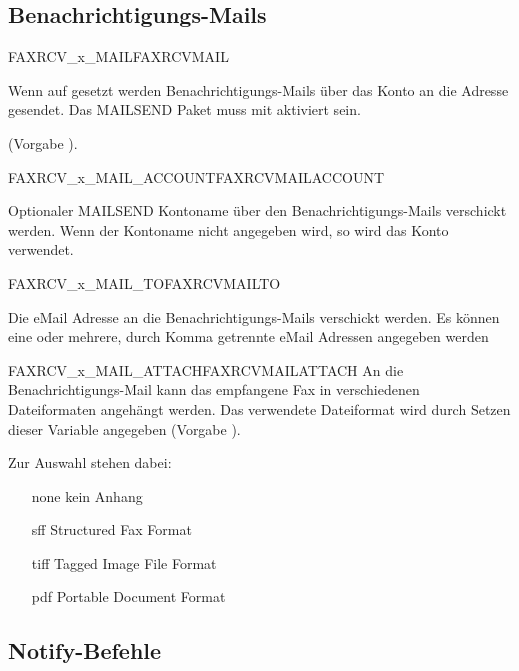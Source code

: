 \subsection{Benachrichtigungs-Mails}

\begin {description}

 {FAXRCV\_x\_MAIL}{FAXRCVMAIL}

  Wenn auf  gesetzt werden Benachrichtigungs-Mails über das Konto 
   an die Adresse 
   gesendet.
  Das MAILSEND Paket muss mit  aktiviert sein.
  
  (Vorgabe ). 
  
 {FAXRCV\_x\_MAIL\_ACCOUNT}{FAXRCVMAILACCOUNT}

  Optionaler MAILSEND Kontoname über den Benachrichtigungs-Mails verschickt werden.
  Wenn der Kontoname nicht angegeben wird, so wird das Konto 
  verwendet.

 {FAXRCV\_x\_MAIL\_TO}{FAXRCVMAILTO}

  Die eMail Adresse an die Benachrichtigungs-Mails verschickt werden.
  Es können eine oder mehrere, durch Komma getrennte eMail Adressen angegeben werden 

 {FAXRCV\_x\_MAIL\_ATTACH}{FAXRCVMAILATTACH}
  An die Benachrichtigungs-Mail kann das empfangene Fax in verschiedenen 
  Dateiformaten angehängt werden.
  Das verwendete Dateiformat wird durch Setzen dieser Variable angegeben 
  (Vorgabe ). 
   
  Zur Auswahl stehen dabei:
  \begin{itemize}
    \item[none] kein Anhang
    \item[sff] Structured Fax Format
    \item[tiff] Tagged Image File Format
    \item[pdf] Portable Document Format
  \end{itemize}
  
\end {description}

\subsection{Notify-Befehle}

